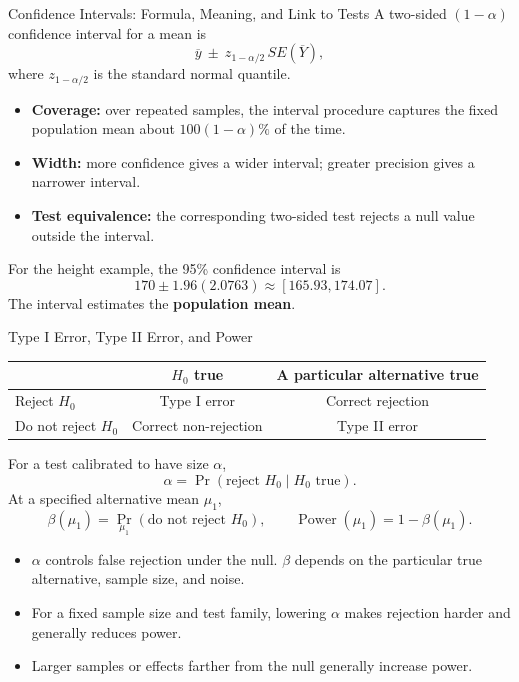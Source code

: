 \documentclass[10pt,aspectratio=169]{beamer}
\newcommand{\Prb}{\operatorname{Pr}}
\begin{document}
\begin{frame}{Confidence Intervals: Formula, Meaning, and Link to Tests}
\small
A two-sided $(1-\alpha)$ confidence interval for a mean is
\[
\overline y\ \pm\ z_{1-\alpha/2}\,SE(\overline Y),
\]
where $z_{1-\alpha/2}$ is the standard normal quantile.
\begin{itemize}
\item \textbf{Coverage:} over repeated samples, the interval procedure captures the fixed population mean about $100(1-\alpha)\%$ of the time.
\item \textbf{Width:} more confidence gives a wider interval; greater precision gives a narrower interval.
\item \textbf{Test equivalence:} the corresponding two-sided test rejects a null value outside the interval.
\end{itemize}
For the height example, the 95\% confidence interval is
\[
170\pm1.96(2.0763)\approx[165.93,174.07].
\]
The interval estimates the \textbf{population mean}.
\end{frame}

\begin{frame}{Type I Error, Type II Error, and Power}
\begin{center}
\begin{tabular}{lcc}
\toprule
 & $H_0$ true & A particular alternative true\\
\midrule
Reject $H_0$ & Type I error & Correct rejection\\
Do not reject $H_0$ & Correct non-rejection & Type II error\\
\bottomrule
\end{tabular}
\end{center}
For a test calibrated to have size $\alpha$,
\[
\alpha=\Prb(\text{reject }H_0\mid H_0\text{ true}).
\]
At a specified alternative mean $\mu_1$,
\[
\beta(\mu_1)=\Prb_{\mu_1}(\text{do not reject }H_0),
\qquad
\operatorname{Power}(\mu_1)=1-\beta(\mu_1).
\]
\begin{itemize}
\item $\alpha$ controls false rejection under the null. $\beta$ depends on the particular true alternative, sample size, and noise.
\item For a fixed sample size and test family, lowering $\alpha$ makes rejection harder and generally reduces power.
\item Larger samples or effects farther from the null generally increase power.
\end{itemize}
\end{frame}
\end{document}
